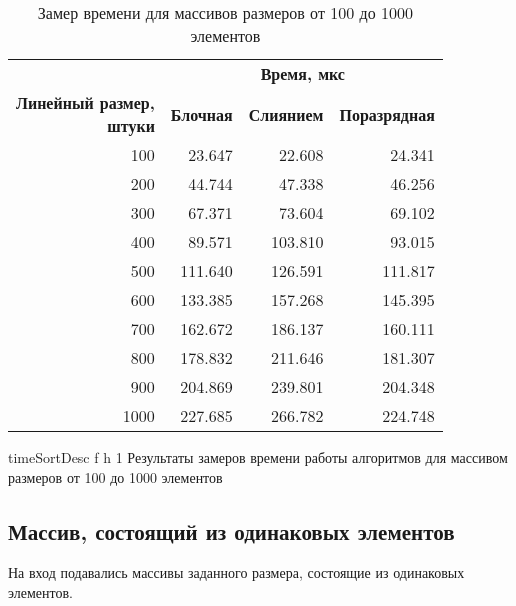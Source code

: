 \begin{table}[ht]
	\small
	\begin{center}
		\begin{threeparttable}
			\caption{Замер времени для массивов размеров от 100 до 1000 элементов}
			\label{tbl:timeDesc}
			\begin{tabular}{|r|r|r|r|}
				\hline
				& \multicolumn{3}{c|}{\bfseries Время, мкс} \\ \cline{2-4}
				\bfseries \makecell{Линейный размер, \\ штуки} & \bfseries Блочная & \bfseries Слиянием & \bfseries Поразрядная \\ \cline{2-4}
				\hline
				100 & 23.647 & 22.608 & 24.341 \\
				\hline
				200 & 44.744 & 47.338 & 46.256 \\
				\hline
				300 & 67.371 & 73.604 & 69.102 \\
				\hline
				400 & 89.571 & 103.810 & 93.015 \\
				\hline
				500 & 111.640 & 126.591 & 111.817 \\
				\hline
				600 & 133.385 & 157.268 & 145.395 \\
				\hline
				700 & 162.672 & 186.137 & 160.111 \\
				\hline
				800 & 178.832 & 211.646 & 181.307 \\
				\hline
				900 & 204.869 & 239.801 & 204.348 \\
				\hline
				1000 & 227.685 & 266.782 & 224.748 \\
				\hline
			\end{tabular}	
		\end{threeparttable}
	\end{center}
\end{table}

{timeSortDesc} %
{f} %
{h} %
{1\textwidth} %
{Результаты замеров времени работы алгоритмов для массивом размеров от 100 до 1000 элементов} %

\clearpage

\subsection{Массив, состоящий из одинаковых элементов}

На вход подавались массивы заданного размера, состоящие из одинаковых элементов.

